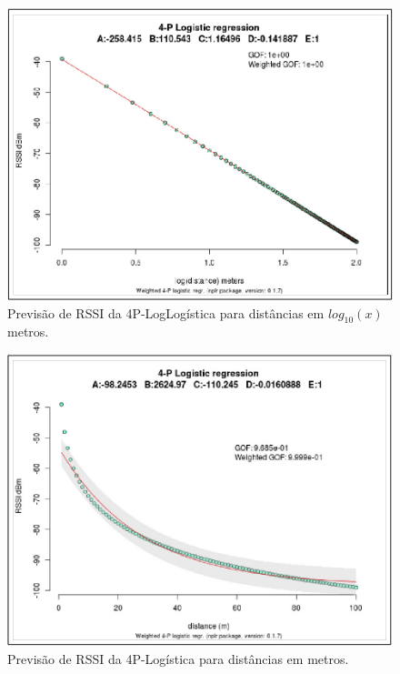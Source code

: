 \documentclass[
	12pt,				%
	twoside,			%
	a4paper,			%
	english,			%
	french,				%
	spanish,			%
	brazil				%
	]{abntex2}
\begin{document}
\begin{figure}[htb]
    \caption{\label{logistic_regression_1} Previsão de RSSI da 4P-LogLogística para distâncias em $ log_{10}(x) $ metros.}
    \begin{center}
        \includegraphics[scale=0.47]{imagens/logistic-regression-1.jpg}
    \end{center}
\end{figure}
\begin{figure}[htb]
    \caption{\label{logistic_regression_2} Previsão de RSSI da 4P-Logística para distâncias em metros.}
    \begin{center}
        \includegraphics[scale=0.47]{imagens/logistic-regression-2.jpg}
    \end{center}
\end{figure}
\end{document}
